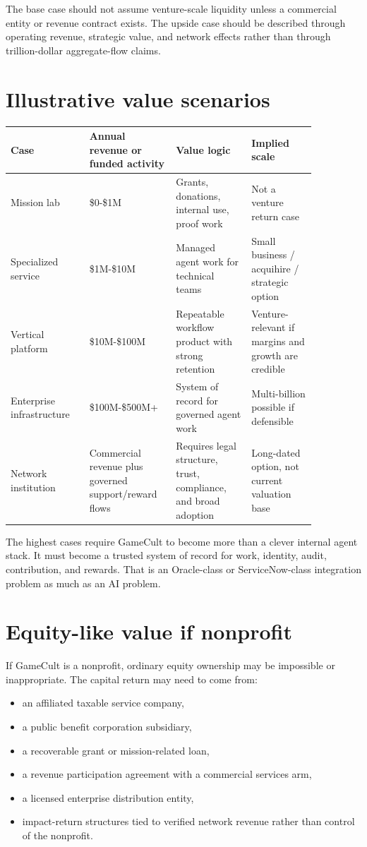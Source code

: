 \documentclass[11pt,oneside]{report}
\begin{document}
The base case should not assume venture-scale liquidity unless a commercial entity or revenue contract exists. The upside case should be described through operating revenue, strategic value, and network effects rather than through trillion-dollar aggregate-flow claims.

\section{Illustrative value scenarios}

\begin{longtable}{P{0.23\linewidth}P{0.22\linewidth}P{0.22\linewidth}P{0.19\linewidth}}
\toprule
\textbf{Case} & \textbf{Annual revenue or funded activity} & \textbf{Value logic} & \textbf{Implied scale} \\
\midrule
Mission lab & \$0-\$1M & Grants, donations, internal use, proof work & Not a venture return case \\
Specialized service & \$1M-\$10M & Managed agent work for technical teams & Small business / acquihire / strategic option \\
Vertical platform & \$10M-\$100M & Repeatable workflow product with strong retention & Venture-relevant if margins and growth are credible \\
Enterprise infrastructure & \$100M-\$500M+ & System of record for governed agent work & Multi-billion possible if defensible \\
Network institution & Commercial revenue plus governed support/reward flows & Requires legal structure, trust, compliance, and broad adoption & Long-dated option, not current valuation base \\
\bottomrule
\end{longtable}

The highest cases require GameCult to become more than a clever internal agent stack. It must become a trusted system of record for work, identity, audit, contribution, and rewards. That is an Oracle-class or ServiceNow-class integration problem as much as an AI problem.

\section{Equity-like value if nonprofit}

If GameCult is a nonprofit, ordinary equity ownership may be impossible or inappropriate. The capital return may need to come from:

\begin{itemize}
  \item an affiliated taxable service company,
  \item a public benefit corporation subsidiary,
  \item a recoverable grant or mission-related loan,
  \item a revenue participation agreement with a commercial services arm,
  \item a licensed enterprise distribution entity,
  \item impact-return structures tied to verified network revenue rather than control of the nonprofit.
\end{itemize}
\end{document}
